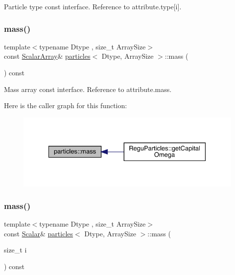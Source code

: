 Particle type const interface. Reference to attribute.\+type\mbox{[}i\mbox{]}. 

\mbox{\label{classparticles_a3da22fd5985987373cf7d5355320374a}} 
\subsubsection{\texorpdfstring{mass()}{mass()}\hspace{0.1cm}{\footnotesize\ttfamily [1/2]}}
{\footnotesize\ttfamily template$<$typename Dtype , size\+\_\+t Array\+Size$>$ \\
const \mbox{\hyperlink{classparticles_ac88daa0d493d17c5ca2fe3a1d3fe4779}{Scalar\+Array}}\& \mbox{\hyperlink{classparticles}{particles}}$<$ Dtype, Array\+Size $>$\+::mass (\begin{DoxyParamCaption}{ }\end{DoxyParamCaption}) const\hspace{0.3cm}{\ttfamily [inline]}}



Mass array const interface. Reference to attribute.\+mass. 

Here is the caller graph for this function\+:
\nopagebreak
\begin{figure}[H]
\begin{center}
\leavevmode
\includegraphics[width=328pt]{classparticles_a3da22fd5985987373cf7d5355320374a_icgraph}
\end{center}
\end{figure}
\mbox{\label{classparticles_affba23a9d10479685f3c8ec995cb1a35}} 
\subsubsection{\texorpdfstring{mass()}{mass()}\hspace{0.1cm}{\footnotesize\ttfamily [2/2]}}
{\footnotesize\ttfamily template$<$typename Dtype , size\+\_\+t Array\+Size$>$ \\
const \mbox{\hyperlink{classparticles_a57a6b6582045a4b20742b99c513e9f63}{Scalar}}\& \mbox{\hyperlink{classparticles}{particles}}$<$ Dtype, Array\+Size $>$\+::mass (\begin{DoxyParamCaption}\item[{size\+\_\+t}]{i }\end{DoxyParamCaption}) const\hspace{0.3cm}{\ttfamily [inline]}}




